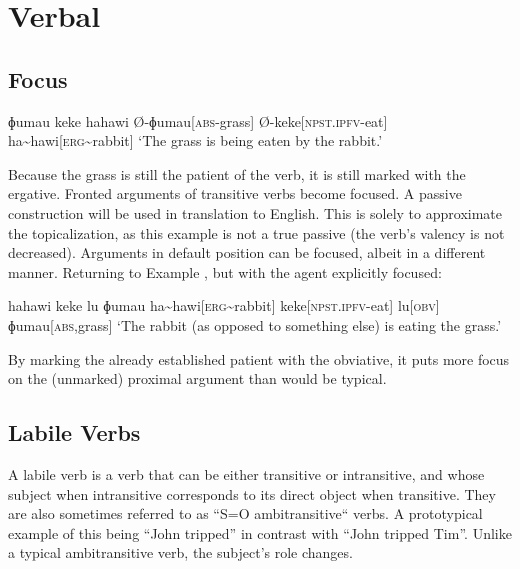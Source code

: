 \chapter{Verbal}

\section{Focus}\label{sec:focus}

\ex
\begingl
\glpreamble ɸumau keke hahawi
\endpreamble
Ø-ɸumau[\textsc{abs-}grass]
Ø-keke[\textsc{npst.ipfv-}eat]
ha\textasciitilde hawi[\textsc{erg\textasciitilde}rabbit]
\glft `The grass is being eaten by the rabbit.'
\endgl
\xe

Because the grass is still the patient of the verb, it is still marked with the ergative. Fronted arguments of transitive verbs become focused. A passive construction will be used in translation to English. This is solely to approximate the topicalization, as this example is not a true passive (the verb's valency is not decreased). Arguments in default position can be focused, albeit in a different manner. Returning to Example , but with the agent explicitly focused:

\ex
\begingl
\glpreamble hahawi keke lu ɸumau
\endpreamble
ha\textasciitilde hawi[\textsc{erg\textasciitilde}rabbit]
keke[\textsc{npst.ipfv-}eat]
lu[\textsc{obv}]
ɸumau[\textsc{abs,}grass]
\glft `The rabbit (as opposed to something else) is eating the grass.'
\endgl
\xe

By marking the already established patient with the obviative\footnotemark, it puts more focus on the (unmarked) proximal argument than would be typical.


\section{Labile Verbs}\label{sec:labile_verbs}

A labile verb is a verb that can be either transitive or intransitive, and whose subject when intransitive corresponds to its direct object when transitive. They are also sometimes referred to as ``S=O ambitransitive`` verbs. A prototypical example of this being ``John tripped'' in contrast with ``John tripped Tim''. Unlike a typical ambitransitive verb, the subject's role changes.

